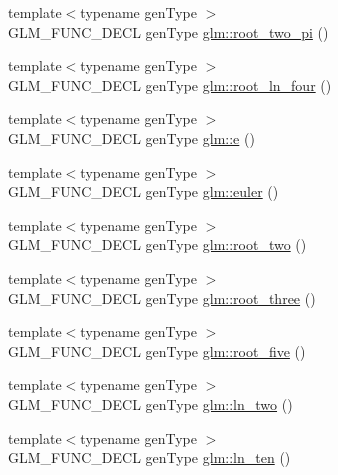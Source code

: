 \begin{DoxyCompactItemize}
\item 
{\footnotesize template$<$typename gen\-Type $>$ }\\G\-L\-M\-\_\-\-F\-U\-N\-C\-\_\-\-D\-E\-C\-L gen\-Type \hyperlink{group__gtc__constants_gae991b4d39c57b57990054eec3677597c}{glm\-::root\-\_\-two\-\_\-pi} ()
\item 
{\footnotesize template$<$typename gen\-Type $>$ }\\G\-L\-M\-\_\-\-F\-U\-N\-C\-\_\-\-D\-E\-C\-L gen\-Type \hyperlink{group__gtc__constants_ga9cae3fad9314e34c1d3aab71fcdef05f}{glm\-::root\-\_\-ln\-\_\-four} ()
\item 
{\footnotesize template$<$typename gen\-Type $>$ }\\G\-L\-M\-\_\-\-F\-U\-N\-C\-\_\-\-D\-E\-C\-L gen\-Type \hyperlink{group__gtc__constants_gab83fb6de0f05d6c0d11bdf0479f8319e}{glm\-::e} ()
\item 
{\footnotesize template$<$typename gen\-Type $>$ }\\G\-L\-M\-\_\-\-F\-U\-N\-C\-\_\-\-D\-E\-C\-L gen\-Type \hyperlink{group__gtc__constants_ga6f14b46653b7ead1edcbd0fc6c9c5289}{glm\-::euler} ()
\item 
{\footnotesize template$<$typename gen\-Type $>$ }\\G\-L\-M\-\_\-\-F\-U\-N\-C\-\_\-\-D\-E\-C\-L gen\-Type \hyperlink{group__gtc__constants_gab91b7799f88f9f2be33e385dec11b9c2}{glm\-::root\-\_\-two} ()
\item 
{\footnotesize template$<$typename gen\-Type $>$ }\\G\-L\-M\-\_\-\-F\-U\-N\-C\-\_\-\-D\-E\-C\-L gen\-Type \hyperlink{group__gtc__constants_gab3183635ac615473e2f95852f491be83}{glm\-::root\-\_\-three} ()
\item 
{\footnotesize template$<$typename gen\-Type $>$ }\\G\-L\-M\-\_\-\-F\-U\-N\-C\-\_\-\-D\-E\-C\-L gen\-Type \hyperlink{group__gtc__constants_gace2b8dfed1ab9fabbb67dde08e7e5b58}{glm\-::root\-\_\-five} ()
\item 
{\footnotesize template$<$typename gen\-Type $>$ }\\G\-L\-M\-\_\-\-F\-U\-N\-C\-\_\-\-D\-E\-C\-L gen\-Type \hyperlink{group__gtc__constants_ga22fae798430edc3022766af4fd83e8a4}{glm\-::ln\-\_\-two} ()
\item 
{\footnotesize template$<$typename gen\-Type $>$ }\\G\-L\-M\-\_\-\-F\-U\-N\-C\-\_\-\-D\-E\-C\-L gen\-Type \hyperlink{group__gtc__constants_ga48addf0cb0980277d208a71a1c59c073}{glm\-::ln\-\_\-ten} ()
\item 

\end{DoxyCompactItemize}
